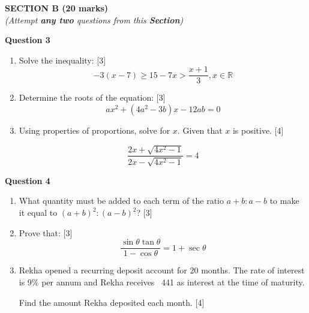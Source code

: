 \newpage
\begin{center}
   \large
   \textbf{SECTION B (20 marks)}\\
   \vspace{5mm}
   \normalsize
   \textit{(Attempt \textbf{any two} questions from this \textbf{Section})}
\end{center}
\par

\noindent
\textbf{Question 3}
\begin{enumerate}[label=(\roman*)]

    \item Solve the inequality: \hfill [3]
        \[
            -3(x-7) \geq 15 - 7x > \frac{x+1}{3}, x \in \mathbb{R}
        \]

    \item Determine the roots of the equation: \hfill [3]
        \[
            ax^2 + (4a^2 - 3b)x - 12ab = 0
        \]

    \item Using properties of proportions, solve for $x$. Given 
        that $x$ is positive. \hfill [4]

        \[
            \frac{2x + \sqrt{4x^2 - 1}}{2x - \sqrt{4x^2 - 1}} = 4
        \]

\end{enumerate}

\noindent
\textbf{Question 4}
\begin{enumerate}[label=(\roman*)]

    \item What quantity must be added to each term of the ratio 
        $a+b : a-b$ to make it equal to $(a+b)^2 : (a-b)^2$? \hfill [3]

    \item Prove that: \hfill [3]
        \[
            \frac{\sin \theta \tan \theta}{1 - \cos \theta} = 1 + \sec \theta
        \]

    \item Rekha opened a recurring deposit account for 20 months. 
        The rate of interest is 9\% per annum and Rekha receives
        \rupee~441 as interest at the time of maturity.

        Find the amount Rekha deposited each month. \hfill [4]

\end{enumerate}

